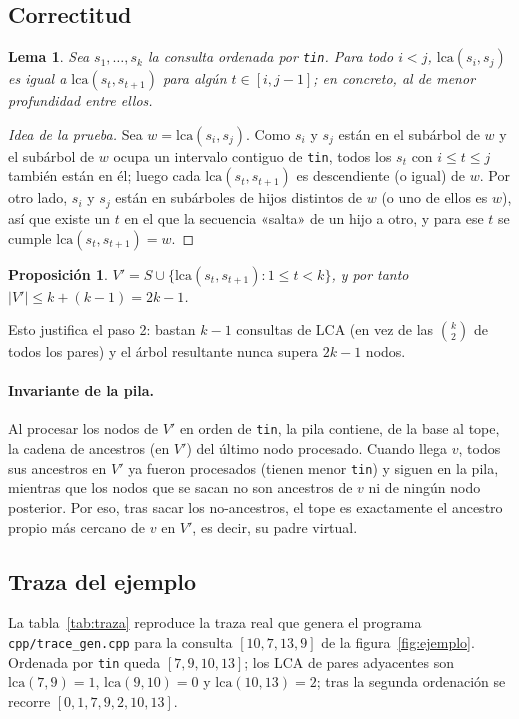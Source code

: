 \documentclass[11pt,a4paper]{article}
\theoremstyle{plain}
\newtheorem{lema}{Lema}
\newtheorem{prop}{Proposición}
\begin{document}
\subsection{Correctitud}

\begin{lema}\label{lem:adyacentes}
Sea $s_1, \dots, s_k$ la consulta ordenada por \texttt{tin}. Para todo $i < j$,
$\mathrm{lca}(s_i, s_j)$ es igual a $\mathrm{lca}(s_t, s_{t+1})$ para algún $t \in [i, j-1]$;
en concreto, al de menor profundidad entre ellos.
\end{lema}
\begin{proof}[Idea de la prueba]
Sea $w = \mathrm{lca}(s_i, s_j)$. Como $s_i$ y $s_j$ están en el subárbol de $w$ y el
subárbol de $w$ ocupa un intervalo contiguo de \texttt{tin}, todos los $s_t$ con
$i \le t \le j$ también están en él; luego cada $\mathrm{lca}(s_t, s_{t+1})$ es descendiente
(o igual) de $w$. Por otro lado, $s_i$ y $s_j$ están en subárboles de hijos distintos de $w$
(o uno de ellos es $w$), así que existe un $t$ en el que la secuencia «salta» de un hijo a
otro, y para ese $t$ se cumple $\mathrm{lca}(s_t, s_{t+1}) = w$.
\end{proof}

\begin{prop}
$V' = S \cup \{\mathrm{lca}(s_t, s_{t+1}) : 1 \le t < k\}$, y por tanto
$|V'| \le k + (k-1) = 2k-1$.
\end{prop}
Esto justifica el paso 2: bastan $k-1$ consultas de LCA (en vez de las $\binom{k}{2}$ de todos
los pares) y el árbol resultante nunca supera $2k-1$ nodos.

\paragraph{Invariante de la pila.} Al procesar los nodos de $V'$ en orden de \texttt{tin},
la pila contiene, de la base al tope, la cadena de ancestros (en $V'$) del último nodo
procesado. Cuando llega $v$, todos sus ancestros en $V'$ ya fueron procesados (tienen menor
\texttt{tin}) y siguen en la pila, mientras que los nodos que se sacan no son ancestros de
$v$ ni de ningún nodo posterior. Por eso, tras sacar los no-ancestros, el tope es exactamente
el ancestro propio más cercano de $v$ en $V'$, es decir, su padre virtual.

\subsection{Traza del ejemplo}
La tabla~\ref{tab:traza} reproduce la traza real que genera el programa \texttt{cpp/trace\_gen.cpp} para
la consulta $[10, 7, 13, 9]$ de la figura~\ref{fig:ejemplo}. Ordenada por \texttt{tin} queda
$[7, 9, 10, 13]$; los LCA de pares adyacentes son $\mathrm{lca}(7,9)=1$,
$\mathrm{lca}(9,10)=0$ y $\mathrm{lca}(10,13)=2$; tras la segunda ordenación se recorre
$[0, 1, 7, 9, 2, 10, 13]$.
\end{document}
